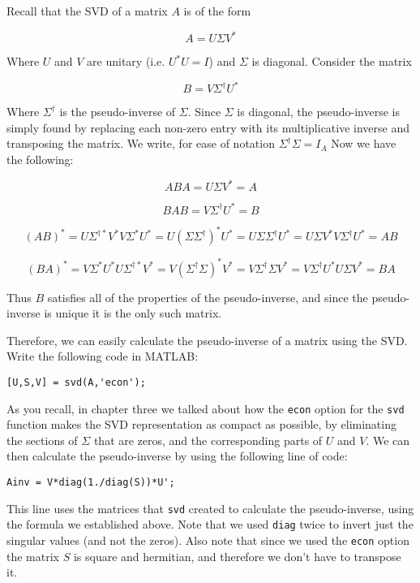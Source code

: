 Recall that the SVD of a matrix $A$ is of the form

\[
A = U \Sigma V^*
\]

Where $U$ and $V$ are unitary (i.e. $U^*U = I$) and $\Sigma$ is diagonal. Consider the matrix

\[
B = V \Sigma^\dagger U^*
\]

Where $\Sigma^\dagger$ is the pseudo-inverse of $\Sigma$. Since $\Sigma$ is diagonal, the pseudo-inverse is simply found by replacing each non-zero entry with its multiplicative inverse and transposing the matrix. We write, for ease of notation $\Sigma^\dagger \Sigma = I_A$ Now we have the following:

\[
ABA = U \Sigma V^* = A
\]

\[
BAB = V \Sigma^\dagger U^* = B
\]

\[
(AB)^* = U \Sigma^{\dagger *} V^* V \Sigma^* U^* = U (\Sigma \Sigma^\dagger)^* U^* = U \Sigma \Sigma^\dagger U^* = U \Sigma V^* V \Sigma^\dagger U^* = AB
\]

\[
(BA)^* =  V \Sigma^* U^* U \Sigma^{\dagger *} V^* = V (\Sigma^\dagger \Sigma)^* V^* = V  \Sigma^\dagger \Sigma V^* =  V \Sigma^\dagger U^* U \Sigma V^* = BA
\]

Thus $B$ satisfies all of the properties of the pseudo-inverse, and since the pseudo-inverse is unique it is the only such matrix.

Therefore, we can easily calculate the pseudo-inverse of a matrix using the SVD. Write the following code in MATLAB:

\begin{verbatim}
[U,S,V] = svd(A,'econ');
\end{verbatim}

As you recall, in chapter three we talked about how the {\tt econ} option for the {\tt svd} function makes the SVD representation as compact as possible, by eliminating the sections of $\Sigma$ that are zeros, and the corresponding parts of $U$ and $V$. We can then calculate the pseudo-inverse by using the following line of code:

\begin{verbatim}
Ainv = V*diag(1./diag(S))*U';
\end{verbatim}

This line uses the matrices that {\tt svd} created to calculate the pseudo-inverse, using the formula we established above. Note that we used {\tt diag} twice to invert just the singular values (and not the zeros). Also note that since we used the {\tt econ} option the matrix $S$ is square and hermitian, and therefore we don't have to transpose it.

